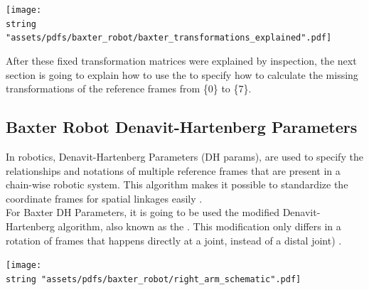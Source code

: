 \documentclass[11pt]{report} %
\begin{document}
\begin{center}
\texttt{[image: \\string "assets/pdfs/baxter\_robot/baxter\_transformations\_explained".pdf]}
\bigbreak
\begin{minipage}{\linewidth} %
\label{fig_baxter_transformations_graphic_way}
\end{minipage} \end{center}

After these fixed transformation matrices were explained by inspection, the next section is going to explain how to use the  to specify how to calculate the missing transformations of the reference frames from \{0\} to \{7\}.\\


\subsection{Baxter Robot Denavit-Hartenberg Parameters}

In robotics, Denavit-Hartenberg Parameters (DH params), are used to specify the relationships and notations of multiple reference frames that are present in a chain-wise robotic system. This algorithm makes it possible to standardize the coordinate frames for spatial linkages easily \citep{cite_denativ_hartenberg}.\\

For Baxter DH Parameters, it is going to be used the modified Denavit-Hartenberg algorithm, also known as the . This modification only differs in a rotation of frames that happens directly at a joint, instead of a distal joint) \citep{cite_craig_robotics}.\\

\begin{center}
\texttt{[image: \\string "assets/pdfs/baxter\_robot/right\_arm\_schematic".pdf]}
\bigbreak
\begin{minipage}{\linewidth} %
\label{fig_baxter_schematic_right_arm}
\end{minipage} \end{center}
\end{document}
